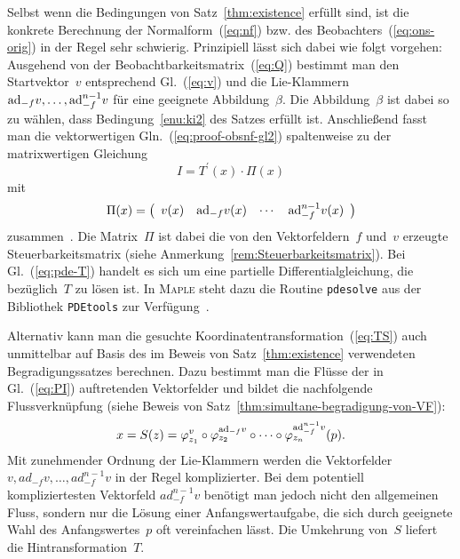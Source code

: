 Selbst wenn die Bedingungen von Satz~\ref{thm:existence} erfüllt
sind, ist die konkrete Berechnung der Normalform~(\ref{eq:nf}) bzw.
des Beobachters~(\ref{eq:ons-orig}) in der Regel sehr schwierig.
Prinzipiell lässt sich dabei wie folgt vorgehen: Ausgehend von der
Beobachtbarkeitsmatrix~(\ref{eq:Q}) bestimmt man den Startvektor~$v$
entsprechend Gl.~(\ref{eq:v}) und die Lie-Klammern ${\operatorname{ad}}_{-f}v,\ldots,{\operatorname{ad}}_{-f}^{n-1}v$
für eine geeignete Abbildung~$\beta$. Die Abbildung~$\beta$ ist
dabei so zu wählen, dass Bedingung~\ref{enu:ki2} des Satzes erfüllt
ist. Anschließend fasst man die vektorwertigen Gln.~(\ref{eq:proof-obsnf-gl2})
spaltenweise zu der matrixwertigen Gleichung 
\begin{equation}
I=T^{\prime}(x)\cdot\Pi(x)\label{eq:pde-T}
\end{equation}
mit
\begin{equation}
\Pi(x)=\left(\begin{array}{cccc}
v(x) & {\operatorname{ad}}_{-f}v(x) & \cdots & {\operatorname{ad}}_{-f}^{n-1}v(x)\end{array}\right)\label{eq:PI}
\end{equation}
zusammen~\cite{schaffner99}. Die Matrix~$\Pi$ ist dabei die von
den Vektorfeldern~$f$ und~$v$ erzeugte Steuerbarkeitsmatrix (siehe
Anmerkung~\ref{rem:Steuerbarkeitsmatrix}). Bei Gl.~(\ref{eq:pde-T})
handelt es sich um eine partielle Differentialgleichung, die bezüglich~$T$
zu lösen ist. In \textsc{Maple} steht dazu die Routine \texttt{pdesolve}
aus der Bibliothek \texttt{PDEtools} zur Verfügung~\cite{chep-terrab1995}. 

Alternativ kann man die gesuchte Koordinatentransformation~(\ref{eq:TS})
auch unmittelbar auf Basis des im Beweis von Satz~\ref{thm:existence}
verwendeten Begradigungssatzes berechnen. Dazu bestimmt man die Flüsse
der in Gl.~(\ref{eq:PI}) auftretenden Vektor\-felder und bildet
die nachfolgende Flussverknüpfung (siehe
Beweis von Satz~\ref{thm:simultane-begradigung-von-VF}):
\begin{equation}
x=S(z)=\varphi_{z_{1}}^{v}\circ\varphi_{z_{2}}^{{\operatorname{ad}}_{-f}v}\circ\cdots\circ\varphi_{z_{n}}^{{\operatorname{ad}}_{-f}^{n-1}v}(p).\label{eq:verknuepfung-der-fluesse}
\end{equation}
Mit zunehmender Ordnung der Lie-Klammern werden die Vektor\-felder
$v,ad_{-f}v,\ldots,ad_{-f}^{n-1}v$ in der Regel komplizierter. Bei
dem potentiell kompliziertesten Vektor\-feld $ad_{-f}^{n-1}v$ benötigt
man jedoch nicht den allgemeinen Fluss, sondern nur die Lösung einer
Anfangswertaufgabe, die sich durch geeignete Wahl des Anfangswertes~$p$
oft vereinfachen lässt. Die Umkehrung von~$S$ liefert die Hintransformation~$T$.

